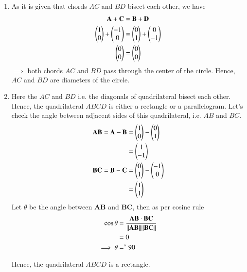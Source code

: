 \documentclass[journal,12pt,twocolumn]{IEEEtran}
\let\vec\mathbf
\begin{document}
\begin{enumerate}
    \item As it is given that chords $AC$ and $BD$ bisect each other, we have
    \begin{align}
        \vec{A} + \vec{C} &= \vec{B} + \vec{D} \\
        \myvec{1 \\ 0} + \myvec{-1 \\ 0} &= \myvec{0 \\ 1} + \myvec{0 \\ -1} \\
        \myvec{0 \\ 0} &= \myvec{0 \\ 0} 
    \end{align}
    $\implies$ both chords $AC$ and $BD$ pass through the center of the circle.
    Hence, $AC$ and $BD$ are diameters of the circle.

    \item Here the $AC$ and $BD$ i.e. the diagonals of quadrilateral bisect each other. Hence, the quadrilateral $ABCD$ is either a rectangle or a parallelogram.
    Let's check the angle between adjacent sides of this quadrilateral, i.e. $AB$ and $BC$.
    \begin{align}
        \vec{AB} = \vec{A} - \vec{B} &= \myvec{1 \\ 0} - \myvec{0 \\ 1} \\
        &= \myvec{1 \\ -1} \\
        \vec{BC} = \vec{B} - \vec{C} &= \myvec{0 \\ 1} - \myvec{-1 \\ 0} \\
        &= \myvec{1 \\ 1} \\
    \end{align}
    Let $\theta$ be the angle between $\vec{AB}$ and $\vec{BC}$, then as per cosine rule
    \begin{align}
        \cos\theta &= \frac{\vec{AB} \cdot \vec{BC}}{\norm{\vec{AB}} \norm{\vec{BC}}} \\
        &= 0 \\
        \implies \theta &= \degree90
    \end{align}
    
    Hence, the quadrilateral $ABCD$ is a rectangle.
\end{enumerate}

\end{document}
